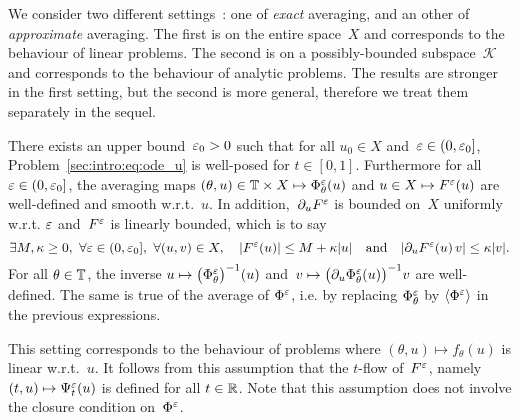 We consider two different settings~: one of \textit{exact} averaging,
and an other of \textit{approximate} averaging. The first is on the
entire space~$X$ and corresponds to the behaviour of linear problems.
The second is on a possibly-bounded subspace~$\mathcal{K}$ and
corresponds to the behaviour of analytic problems. The results are
stronger in the first setting, but the second is more general, therefore
we treat them separately in the sequel.

\begin{assumption} \label{hyp:exist_avg_lin}
  There exists an upper bound~$\varepsilon_0 > 0$ such that for all $u_0 \in X$
  and~$\varepsilon \in (0, \varepsilon_0]$, Problem~\eqref{sec:intro:eq:ode_u} is
  well-posed for $t \in [0,1]$. Furthermore for all $\varepsilon \in (0,
  \varepsilon_0]$, the averaging maps $(\theta, u) \in \mathbb{T} \times X \mapsto
  \Phi^\varepsilon_\theta(u)$ and $u \in X \mapsto F^\varepsilon (u)$ are well-defined
  and smooth w.r.t.~$u$. In addition,~$\partial_u F^\varepsilon$ is bounded on~$X$
  uniformly w.r.t. $\varepsilon$ and~$F^\varepsilon$ is linearly bounded, which is to
  say
  \begin{equation*}
    \exists M, \kappa \geq 0,\ \forall \eps \in (0, \eps_0],\ 
    \forall (u,v) \in X, \quad
    |F^\eps(u)| \leq M + \kappa |u|
    \quad\text{and}\quad
    |\pa_u F^\eps (u)\, v| \leq \kappa |v| .
  \end{equation*}
  For all $\theta \in \mathbb{T}$, the inverse $u \mapsto \big(\Phi^\varepsilon _\theta
  \big)^{-1}(u)$ and~$v \mapsto \big( \partial_u \Phi^\varepsilon _\theta(u)
  \big)^{-1} v$ are well-defined. The same is true of the average of
  $\Phi^\varepsilon$, i.e. by replacing $\Phi^\varepsilon _\theta$ by $\langle \Phi^\varepsilon
  \rangle$ in the previous expressions. 
\end{assumption}
This setting corresponds to the behaviour of problems where $(\theta, u)
\mapsto f_\theta(u)$ is linear w.r.t.~$u$. It follows from this
assumption that the $t$-flow of~$F^\varepsilon$, namely~$(t,u) \mapsto
\Psi^\varepsilon _t(u)$ is defined for all $t \in \mathbb{R}$. Note that this
assumption does not involve the closure condition on~$\Phi^\varepsilon$.


